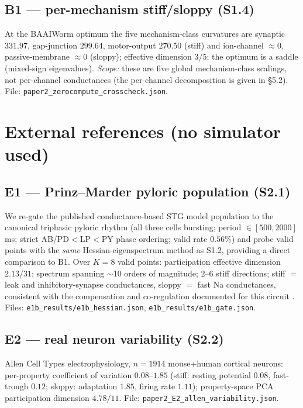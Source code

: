\documentclass[11pt]{article}
\begin{document}
\subsection{B1 --- per-mechanism stiff/sloppy (S1.4)}
At the BAAIWorm optimum the five mechanism-class curvatures are synaptic $331.97$, gap-junction $299.64$, motor-output $270.50$ (stiff) and ion-channel $\approx0$, passive-membrane $\approx0$ (sloppy); effective dimension $3/5$; the optimum is a saddle (mixed-sign eigenvalues). \emph{Scope:} these are five global mechanism-class scalings, not per-channel conductances (the per-channel decomposition is given in \S5.2). File: \texttt{paper2\_zerocompute\_crosscheck.json}.

\section{External references (no simulator used)}

\subsection{E1 --- Prinz--Marder pyloric population (S2.1)}
We re-gate the published conductance-based STG model population \citep{prinz2004similar} to the canonical triphasic pyloric rhythm (all three cells bursting; period $\in[500,2000]$\,ms; strict AB/PD$<$LP$<$PY phase ordering; valid rate $0.56\%$) and probe valid points with the \emph{same} Hessian-eigenspectrum method as S1.2, providing a direct comparison to B1. Over $K{=}8$ valid points: participation effective dimension $2.13/31$; spectrum spanning $\sim$10 orders of magnitude; $2$--$6$ stiff directions; stiff $=$ leak and inhibitory-synapse conductances, sloppy $=$ fast Na conductances, consistent with the compensation and co-regulation documented for this circuit \citep{marder2011variability,goldman2001global,taylor2009how,alonso2019visualization}. Files: \texttt{e1b\_results/e1b\_hessian.json}, \texttt{e1b\_results/e1b\_gate.json}.

\subsection{E2 --- real neuron variability (S2.2)}
Allen Cell Types electrophysiology, $n{=}1914$ mouse+human cortical neurons: per-property coefficient of variation $0.08$--$1.85$ (stiff: resting potential $0.08$, fast-trough $0.12$; sloppy: adaptation $1.85$, firing rate $1.11$); property-space PCA participation dimension $4.78/11$. File: \texttt{paper2\_E2\_allen\_variability.json}.
\end{document}
